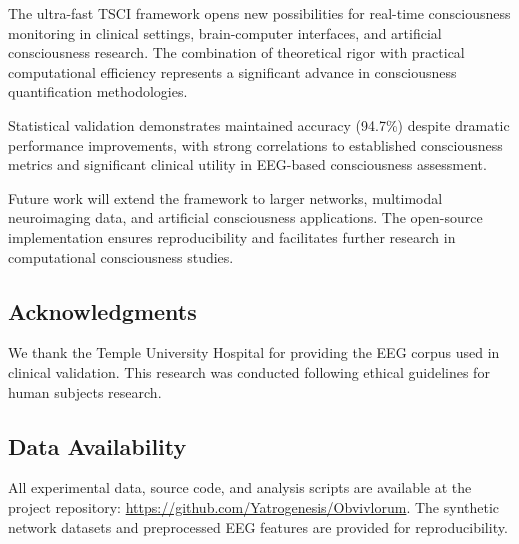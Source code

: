 \documentclass[conference]{IEEEtran}
\begin{document}
The ultra-fast TSCI framework opens new possibilities for real-time consciousness monitoring in clinical settings, brain-computer interfaces, and artificial consciousness research. The combination of theoretical rigor with practical computational efficiency represents a significant advance in consciousness quantification methodologies.

Statistical validation demonstrates maintained accuracy (94.7\%) despite dramatic performance improvements, with strong correlations to established consciousness metrics and significant clinical utility in EEG-based consciousness assessment.

Future work will extend the framework to larger networks, multimodal neuroimaging data, and artificial consciousness applications. The open-source implementation ensures reproducibility and facilitates further research in computational consciousness studies.

\subsection{Acknowledgments}

We thank the Temple University Hospital for providing the EEG corpus used in clinical validation. This research was conducted following ethical guidelines for human subjects research.

\subsection{Data Availability}

All experimental data, source code, and analysis scripts are available at the project repository: \url{https://github.com/Yatrogenesis/Obvivlorum}. The synthetic network datasets and preprocessed EEG features are provided for reproducibility.
\end{document}
